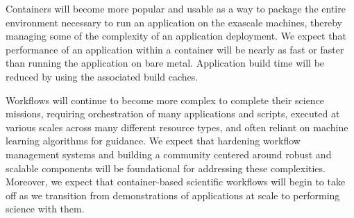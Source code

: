 Containers will become more popular and usable as a way to package the entire 
environment necessary to run an application on the exascale machines, thereby managing some of the 
complexity of an application deployment.  We expect that performance of an application within a 
container will be nearly as fast or faster than running the application on bare metal.  Application
build time will be reduced by using the associated build caches.

Workflows will continue to become more complex to complete their science missions, requiring
orchestration of many applications and scripts, executed at various scales across many 
different resource types, and often reliant on machine learning algorithms for guidance.
We expect that hardening workflow management systems and building a community centered
around robust and scalable components will be foundational for addressing these
complexities.  Moreover, we expect that container-based scientific workflows will 
begin to take off as we transition from demonstrations of applications at scale 
to performing science with them.

